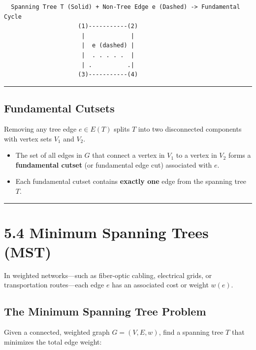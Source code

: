 \documentclass[
]{book}
\providecommand{\tightlist}{%
  \setlength{\itemsep}{0pt}\setlength{\parskip}{0pt}}
\theoremstyle{definition}
\theoremstyle{definition}
\theoremstyle{definition}
\theoremstyle{definition}
\theoremstyle{remark}
\begin{document}
\begin{verbatim}
  Spanning Tree T (Solid) + Non-Tree Edge e (Dashed) -> Fundamental Cycle
                     (1)-----------(2)
                      |             |
                      |  e (dashed) |
                      |  . . . . .  |
                      | .          .|
                     (3)-----------(4)
\end{verbatim}

\begin{center}\rule{0.5\linewidth}{0.5pt}\end{center}

\subsection{Fundamental Cutsets}\label{fundamental-cutsets}

Removing any tree edge \(e \in E(T)\) splits \(T\) into two disconnected components with vertex sets \(V_1\) and \(V_2\).

\begin{itemize}
\tightlist
\item
  The set of all edges in \(G\) that connect a vertex in \(V_1\) to a vertex in \(V_2\) forms a \textbf{fundamental cutset} (or fundamental edge cut) associated with \(e\).
\item
  Each fundamental cutset contains \textbf{exactly one} edge from the spanning tree \(T\).
\end{itemize}

\begin{center}\rule{0.5\linewidth}{0.5pt}\end{center}

\section{5.4 Minimum Spanning Trees (MST)}\label{minimum-spanning-trees-mst}

In weighted networks---such as fiber-optic cabling, electrical grids, or transportation routes---each edge \(e\) has an associated cost or weight \(w(e)\).

\subsection{The Minimum Spanning Tree Problem}\label{the-minimum-spanning-tree-problem}

Given a connected, weighted graph \(G = (V, E, w)\), find a spanning tree \(T\) that minimizes the total edge weight:
\end{document}
